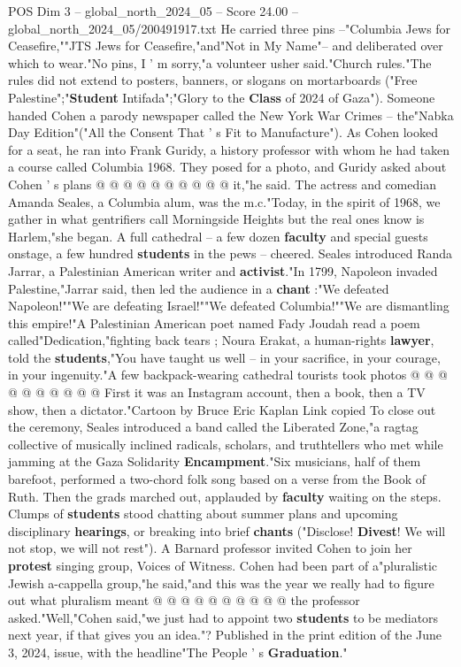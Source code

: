 \begin{textsample}{POS Dim 3 – global\_north\_2024\_05 – Score 24.00 – global\_north\_2024\_05/200491917.txt}
He carried three pins --"Columbia Jews for Ceasefire,""JTS Jews for Ceasefire,"and"Not in My Name"-- and deliberated over which to wear."No pins, I ' m sorry,"a volunteer usher said."Church rules."The rules did not extend to posters, banners, or slogans on mortarboards ("Free Palestine";"\textbf{Student} Intifada";"Glory to the \textbf{Class} of 2024 of Gaza").
Someone handed Cohen a parody newspaper called the New York War Crimes -- the"Nabka Day Edition"("All the Consent That ' s Fit to Manufacture").
As Cohen looked for a seat, he ran into Frank Guridy, a history professor with whom he had taken a course called Columbia 1968.
They posed for a photo, and Guridy asked about Cohen ' s plans @ @ @ @ @ @ @ @ @ @ it,"he said.
The actress and comedian Amanda Seales, a Columbia alum, was the m.c."Today, in the spirit of 1968, we gather in what gentrifiers call Morningside Heights but the real ones know is Harlem,"she began.
A full cathedral -- a few dozen \textbf{faculty} and special guests onstage, a few hundred \textbf{students} in the pews -- cheered.
Seales introduced Randa Jarrar, a Palestinian American writer and \textbf{activist}."In 1799, Napoleon invaded Palestine,"Jarrar said, then led the audience in a \textbf{chant} :"We defeated Napoleon!""We are defeating Israel!""We defeated Columbia!""We are dismantling this empire!"A Palestinian American poet named Fady Joudah read a poem called"Dedication,"fighting back tears ; Noura Erakat, a human-rights \textbf{lawyer}, told the \textbf{students},"You have taught us well -- in your sacrifice, in your courage, in your ingenuity."A few backpack-wearing cathedral tourists took photos @ @ @ @ @ @ @ @ @ @ First it was an Instagram account, then a book, then a TV show, then a dictator."Cartoon by Bruce Eric Kaplan Link copied To close out the ceremony, Seales introduced a band called the Liberated Zone,"a ragtag collective of musically inclined radicals, scholars, and truthtellers who met while jamming at the Gaza Solidarity \textbf{Encampment}."Six musicians, half of them barefoot, performed a two-chord folk song based on a verse from the Book of Ruth.
Then the grads marched out, applauded by \textbf{faculty} waiting on the steps.
Clumps of \textbf{students} stood chatting about summer plans and upcoming disciplinary \textbf{hearings}, or breaking into brief \textbf{chants} ("Disclose! \textbf{Divest}!
We will not stop, we will not rest").
A Barnard professor invited Cohen to join her \textbf{protest} singing group, Voices of Witness.
Cohen had been part of a"pluralistic Jewish a-cappella group,"he said,"and this was the year we really had to figure out what pluralism meant @ @ @ @ @ @ @ @ @ @ the professor asked."Well,"Cohen said,"we just had to appoint two \textbf{students} to be mediators next year, if that gives you an idea."?
Published in the print edition of the June 3, 2024, issue, with the headline"The People ' s \textbf{Graduation}."

\end{textsample}
